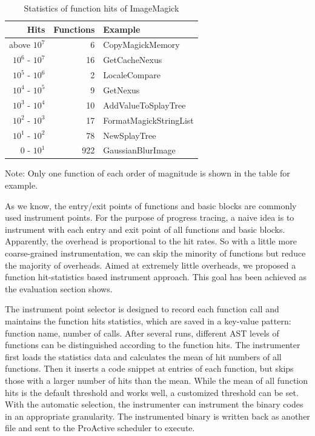 \begin{table}[h]
\caption{Statistics of function hits of ImageMagick}
\label{table:inst-stats}
\begin{center}
\begin{tabular}{r|r|l}
\hline
Hits & Functions & Example \\
\hline
above $10^7$ & 6 & CopyMagickMemory \\
$10^6$ - $10^7$ & 16 & GetCacheNexus \\
$10^5$ - $10^6$ & 2 & LocaleCompare \\
$10^4$ - $10^5$ & 9 & GetNexus \\
$10^3$ - $10^4$ & 10 & AddValueToSplayTree \\
$10^2$ - $10^3$ & 17 & FormatMagickStringList \\
$10^1$ - $10^2$ & 78 & NewSplayTree \\
$0$    - $10^1$ & 922 & GaussianBlurImage \\
\hline
\end{tabular}
\end{center}
Note: Only one function of each order of magnitude is shown in the table for example.
\end{table}

As we know, the entry/exit points of functions and basic blocks are commonly used instrument points. For the purpose of progress tracing, a naive idea is to instrument with each entry and exit point of all functions and basic blocks. Apparently, the overhead is proportional to the hit rates. So with a little more coarse-grained instrumentation, we can skip the minority of functions but reduce the majority of overheads. Aimed at extremely little overheads, we proposed a function hit-statistics based instrument approach. This goal has been achieved as the evaluation section shows.

The instrument point selector is designed to record each function call and maintains the function hits statistics, which are saved in a key-value pattern: function name, number of calls. After several runs, different AST levels of functions can be distinguished according to the function hits. The instrumenter first loads the statistics data and calculates the mean of hit numbers of all functions. Then it inserts a code snippet at entries of each function, but skips those with a larger number of hits than the mean. While the mean of all function hits is the default threshold and works well, a customized threshold can be set. With the automatic selection, the instrumenter can instrument the binary codes in an appropriate granularity. The instrumented binary is written back as another file and sent to the ProActive scheduler to execute.

